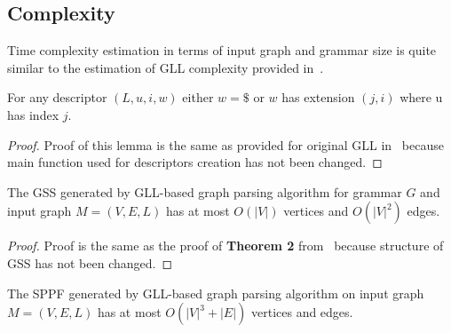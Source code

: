 \subsection{Complexity}

Time complexity estimation in terms of input graph and grammar size is quite similar to the estimation of GLL complexity provided in~\cite{gllParsingTree}.

\begin{lemma}\label{lem:Descriptors}
For any descriptor $(L,u,i,w)$ either $w = \$$ or $w$ has extension $(j,i)$ where u has index $j$.
\end{lemma}
\begin{proof}
Proof of this lemma is the same as provided for original GLL in~\cite{gllParsingTree} because main function used for descriptors creation has not been changed.
\end{proof}


\begin{mytheorem}\label{thm:GSSSpace}
The GSS generated by GLL-based graph parsing algorithm for grammar $G$ and input graph $M=(V,E,L)$ has at most $O(|V|)$ vertices and $O(|V|^2)$ edges.
\end{mytheorem}

\begin{proof}

Proof is the same as the proof of \textbf{Theorem 2} from~\cite{gllParsingTree} because structure of GSS has not been changed. 

\end{proof}

\begin{mytheorem}\label{thm:SPPFSpace}
The SPPF generated by GLL-based graph parsing algorithm on input graph $M=(V, E, L)$ has at most $O(|V|^3 + |E|)$ vertices and edges.
\end{mytheorem}

